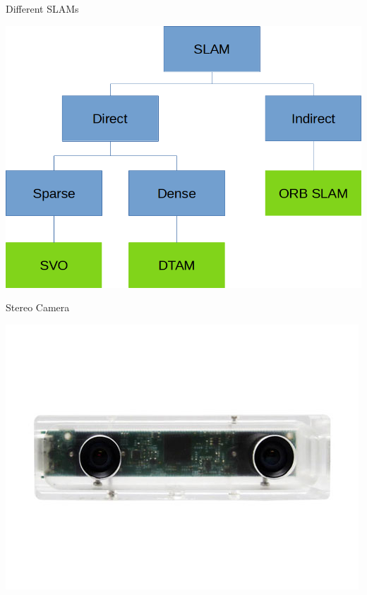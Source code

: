 \documentclass[aspectratio=169]{beamer}
\begin{document}
\begin{frame}{Different SLAMs}
  \begin{center}
    \includegraphics[height=0.9\textheight]{../img/slam_modes.png}
  \end{center}
\end{frame}

\begin{frame}{Stereo Camera}
  \begin{center}
    \includegraphics[height=0.9\textheight]{../img/tara_cam.jpg}
  \end{center}
\end{frame}
\end{document}
